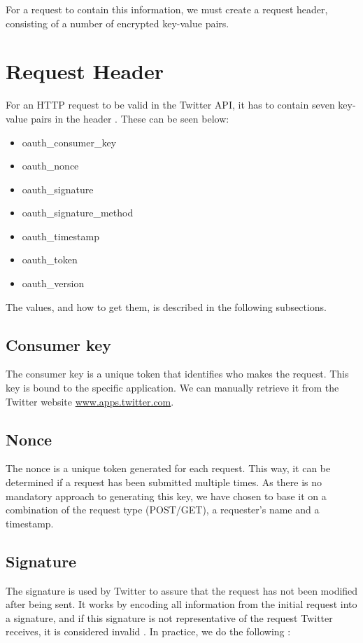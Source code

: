 For a request to contain this information, we must create a request
header, consisting of a number of encrypted key-value pairs. 

\section{Request Header}\label{sec:reqHead}
For an \ac{HTTP} request to be valid in the Twitter API, it has to
contain seven key-value pairs in the header \citep{TwitterAPIAuth}. These can
be seen below:

\begin{itemize}
  \item oauth\_consumer\_key
  \item oauth\_nonce
  \item oauth\_signature
  \item oauth\_signature\_method
  \item oauth\_timestamp
  \item oauth\_token
  \item oauth\_version
\end{itemize}

The values, and how to get them, is described in the following subsections.

\subsection*{Consumer key}
The consumer key is a unique token that identifies who makes the request.
This key is bound to the specific application. We can manually retrieve
it from the Twitter website \url{www.apps.twitter.com}.

\subsection*{Nonce}
The nonce is a unique token generated for each request. This way, it can be
determined if a request has been submitted multiple times. As there is no
mandatory approach to generating this key, we have chosen to base it on a
combination of the request type (POST/GET), a requester's name and a timestamp.

\subsection*{Signature}
The signature is used by Twitter to assure that the request has not been
modified after being sent. It works by encoding all information from the initial
request into a signature, and if this signature is not representative of the
request Twitter receives, it is considered invalid \citep[sec
3.4]{OAuth1}. In practice, we do the following \citep{TwitterAPISignature}:

